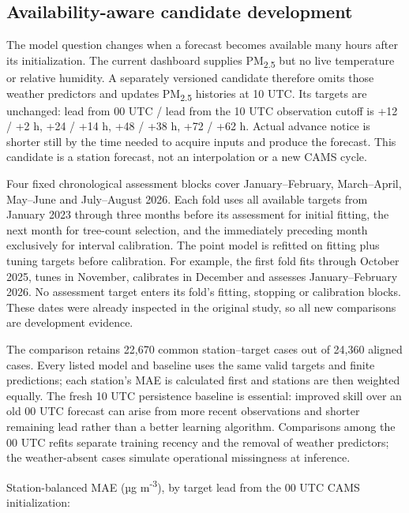 \documentclass[11pt,a4paper]{article}
\begin{document}
\subsection{Availability-aware candidate development}

The model question changes when a forecast becomes available many hours after its initialization. The current dashboard supplies PM\textsubscript{2.5} but no live temperature or relative humidity. A separately versioned candidate therefore omits those weather predictors and updates PM\textsubscript{2.5} histories at 10 UTC. Its targets are unchanged: lead from 00 UTC / lead from the 10 UTC observation cutoff is +12 / +2 h, +24 / +14 h, +48 / +38 h, +72 / +62 h. Actual advance notice is shorter still by the time needed to acquire inputs and produce the forecast. This candidate is a station forecast, not an interpolation or a new CAMS cycle.

Four fixed chronological assessment blocks cover January–February, March–April, May–June and July–August 2026. Each fold uses all available targets from January 2023 through three months before its assessment for initial fitting, the next month for tree-count selection, and the immediately preceding month exclusively for interval calibration. The point model is refitted on fitting plus tuning targets before calibration. For example, the first fold fits through October 2025, tunes in November, calibrates in December and assesses January–February 2026. No assessment target enters its fold's fitting, stopping or calibration blocks. These dates were already inspected in the original study, so all new comparisons are development evidence.

The comparison retains 22,670 common station–target cases out of 24,360 aligned cases. Every listed model and baseline uses the same valid targets and finite predictions; each station's MAE is calculated first and stations are then weighted equally. The fresh 10 UTC persistence baseline is essential: improved skill over an old 00 UTC forecast can arise from more recent observations and shorter remaining lead rather than a better learning algorithm. Comparisons among the 00 UTC refits separate training recency and the removal of weather predictors; the weather-absent cases simulate operational missingness at inference.

Station-balanced MAE (µg m\textsuperscript{-3}), by target lead from the 00 UTC CAMS initialization:
\end{document}
